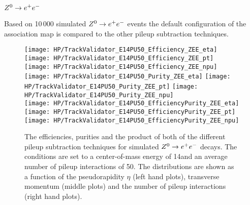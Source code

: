 \subsubsection{$\Zz\rightarrow\EE$}

Based on 10\,000 simulated  $\Zz\rightarrow\EE$ events the default configuration of the association map is compared to the other pileup subtraction techniques.

\begin{figure}[!h]
  \centering
  \texttt{[image: HP/TrackValidator\_E14PU50\_Efficiency\_ZEE\_eta]}
  \texttt{[image: HP/TrackValidator\_E14PU50\_Efficiency\_ZEE\_pt]}
  \texttt{[image: HP/TrackValidator\_E14PU50\_Efficiency\_ZEE\_npu]}
   \\
  \texttt{[image: HP/TrackValidator\_E14PU50\_Purity\_ZEE\_eta]}
  \texttt{[image: HP/TrackValidator\_E14PU50\_Purity\_ZEE\_pt]}
  \texttt{[image: HP/TrackValidator\_E14PU50\_Purity\_ZEE\_npu]}
   \\
  \texttt{[image: HP/TrackValidator\_E14PU50\_EfficiencyPurity\_ZEE\_eta]}
  \texttt{[image: HP/TrackValidator\_E14PU50\_EfficiencyPurity\_ZEE\_pt]}
  \texttt{[image: HP/TrackValidator\_E14PU50\_EfficiencyPurity\_ZEE\_npu]}
  \caption[Efficiencies, purities and their product of the different pileup subtraction techniques for $\Zz\rightarrow\EE$ decays with 14\TeV and PU=50]{The efficiencies, purities and the product of both of the different pileup subtraction techniques for simulated $\Zz\rightarrow\EE$ decays. The conditions are set to a center-of-mass energy of 14\TeV and an average number of pileup interactions of 50. The distributions are shown as a function of the pseudorapidity $\eta$ (left hand plots), transverse momentum (middle plots) and the number of pileup interactions (right hand plots).}
\end{figure}
\clearpage

